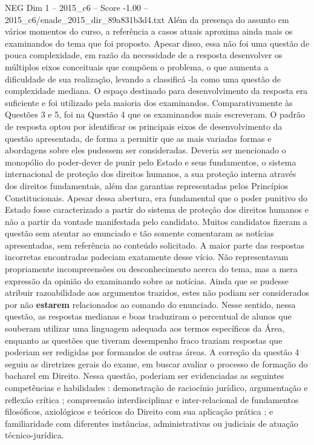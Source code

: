 \begin{textsample}{NEG Dim 1 – 2015\_c6 – Score -1.00 – 2015\_c6/enade\_2015\_dir\_89a831b3d4.txt}
Além da presença do assunto em vários momentos do curso, a referência a casos atuais aproxima ainda mais os examinandos do tema que foi proposto.
Apesar disso, essa não foi uma questão de pouca complexidade, em razão da necessidade de a resposta desenvolver os múltiplos eixos conceituais que compõem o problema, o que aumenta a dificuldade de sua realização, levando a classificá -la como uma questão de complexidade mediana.
O espaço destinado para desenvolvimento da resposta era suficiente e foi utilizado pela maioria dos examinandos.
Comparativamente às Questões 3 e 5, foi na Questão 4 que os examinandos mais escreveram.
O padrão de resposta optou por identificar os principais eixos de desenvolvimento da questão apresentada, de forma a permitir que as mais variadas formas e abordagens sobre eles pudessem ser consideradas.
Deveria ser mencionado o monopólio do poder-dever de punir pelo Estado e seus fundamentos, o sistema internacional de proteção dos direitos humanos, a sua proteção interna através dos direitos fundamentais, além das garantias representadas pelos Princípios Constitucionais.
Apesar dessa abertura, era fundamental que o poder punitivo do Estado fosse caracterizado a partir do sistema de proteção dos direitos humanos e não a partir da vontade manifestada pelo candidato.
Muitos candidatos fizeram a questão sem atentar ao enunciado e tão somente comentaram as notícias apresentadas, sem referência ao conteúdo solicitado.
A maior parte das respostas incorretas encontradas padeciam exatamente desse vício.
Não representavam propriamente incompreensões ou desconhecimento acerca do tema, mas a mera expressão da opinião do examinando sobre as notícias.
Ainda que se pudesse atribuir razoabilidade aos argumentos trazidos, estes não podiam ser considerados por não \textbf{estarem} relacionados ao comando do enunciado.
Nesse sentido, nessa questão, as respostas medianas e boas traduziram o percentual de alunos que souberam utilizar uma linguagem adequada aos termos específicos da Área, enquanto as questões que tiveram desempenho fraco traziam respostas que poderiam ser redigidas por formandos de outras áreas.
A correção da questão 4 seguiu as diretrizes gerais do exame, em buscar avaliar o processo de formação do bacharel em Direito.
Nessa questão, poderiam ser evidenciadas as seguintes competências e habilidades : demonstração de raciocínio jurídico, argumentação e reflexão crítica ; compreensão interdisciplinar e inter-relacional de fundamentos filosóficos, axiológicos e teóricos do Direito com sua aplicação prática ; e familiaridade com diferentes instâncias, administrativas ou judiciais de atuação técnico-jurídica.

\end{textsample}
